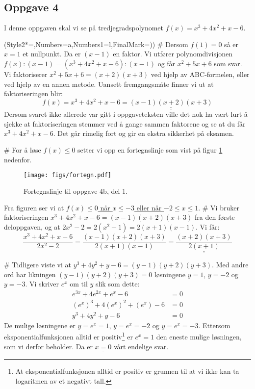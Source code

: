 \documentclass[12pt, a4paper]
{article}						%
\def\answer#1{\underline{\underline{#1}}}
\begin{document}
\subsection*{Oppgave 4}
I denne oppgaven skal vi se på tredjegradspolynomet $f(x) = x^3 + 4x^2 + x - 6$.
\begin{easylist}[enumerate]
	\ListProperties(Style2*=,Numbers=a,Numbers1=l,FinalMark={)})
	# Dersom $f(1) = 0$ så er $x = 1$ et nullpunkt. Da er $(x-1)$ en faktor.
	Vi utfører polynomdivisjonen $f(x) : (x-1) = \left(x^3 + 4x^2 + x - 6\right): (x-1)$
	og får $x^2 + 5x + 6$ som svar. Vi faktoriserer $x^2 + 5x + 6 = (x+2)(x+3)$
	ved hjelp av ABC-formelen, eller ved hjelp av en annen metode.
	Uansett fremgangsmåte finner vi ut at faktoriseringen blir:
	\begin{equation*}
		f(x) = x^3 + 4x^2 + x - 6 = \answer{(x-1)(x+2) (x+3)}
	\end{equation*}
	Dersom svaret ikke allerede var gitt i oppgaveteksten ville det nok ha vært lurt å sjekke at faktoriseringen stemmer ved å gange sammen faktorene og
	se at du får $x^3 + 4x^2 + x - 6$. Det går rimelig fort og gir en ekstra sikkerhet på eksamen.
	
	# For å løse $f(x) \leq 0$ setter vi opp en fortegnslinje som vist på figur \ref{fig:fortegn} nedenfor.
	\begin{figure}[th!]
		\centering
		\texttt{[image: figs/fortegn.pdf]}
		\caption{Fortegnslinje til oppgave 4b, del 1.}
		\label{fig:fortegn}
	\end{figure}

	Fra figuren ser vi at \answer{$f(x) \leq 0$ når $x \leq -3$ eller når $-2 \leq x \leq 1$}.
	# Vi bruker faktoriseringen $x^3 + 4x^2 + x - 6 = (x-1)(x+2) (x+3)$
	fra den første deloppgaven, og at $2x^2 - 2 = 2 (x^2 - 1) = 2(x+1)(x-1)$. Vi får:
	\begin{equation*}
		\frac{x^3 + 4x^2 + x - 6}{2x^2 - 2} = \frac{(x-1)(x+2) (x+3)}{2(x+1)(x-1)} = \answer{\frac{(x+2) (x+3)}{2(x+1)}}
	\end{equation*}
	
	# Tidligere viste vi at $y^3 + 4y^2 + y - 6 = (y-1)(y+2) (y+3)$.
	Med andre ord har likningen $(y-1)(y+2) (y+3) = 0$ løsningene $y = 1$, $y = -2$ og $y = -3$.
	Vi skriver $e^x$ om til $y$ slik som dette:
	\begin{align*}
		e^{3x} + 4e^{2x} + e^{x} - 6 &= 0 \\
		\left(e^x\right)^3 + 4\left(e^x\right)^2 + \left(e^x\right) - 6 &= 0 \\
		y^3 + 4y^2 + y - 6 &= 0
	\end{align*}
	De mulige løsningene er $y = e^x = 1$, $y = e^x = -2$ og $y = e^x = -3$.
	Ettersom eksponentialfunksjonen alltid er positiv\footnote{At eksponentialfunksjonen alltid er positiv er grunnen til at vi ikke kan ta logaritmen av et negativt tall.} er $e^x = 1$
	den eneste mulige løsningen, som vi derfor beholder. Da er $\answer{x = 0}$ vårt endelige svar.
\end{easylist}
\end{document}
